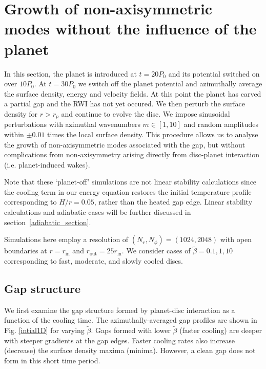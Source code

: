 \section{Growth of non-axisymmetric modes without the influence of the
  planet}\label{linear1}
In this section, the planet is introduced at $t=20P_0$ and 
its potential switched on over $10P_0$. At $t=30P_0$ we switch off the
planet potential and azimuthally average the surface density, energy
and velocity fields. At this point the planet has carved a partial
gap and the RWI has not yet occured.
 We then perturb the surface density for $r>r_p$ and continue to 
evolve the disc. We impose  sinusoidal perturbations with 
azimuthal wavenumbers $m\in[1,10]$ and random amplitudes within $\pm 0.01$
 times the local surface density.%
This procedure allows us to analyse the growth of 
non-axisymmetric modes associated with the gap, but without
complications from non-axisymmetry arising directly from disc-planet
interaction (i.e. planet-induced wakes). 

Note that these `planet-off' simulations are not linear stability
calculations since the cooling term in our energy equation
restores the initial temperature profile corresponding to $H/r=0.05$,
rather than the heated gap edge. Linear stability calculations and
adiabatic cases will be further discussed in
section~\ref{adiabatic_section}.  


Simulations here employ a resolution of $(N_r,N_{\phi})=(1024,2048)$
with open boundaries at $r=r_\mathrm{in}$ and
$r_\mathrm{out}=25r_\mathrm{in}$. We consider   
cases of $\tilde{\beta}=0.1,1,10$ corresponding to fast, moderate,
and slowly cooled discs. %

\subsection{Gap structure}
We first examine the gap structure formed by planet-disc
interaction as a function of the cooling time. The azimuthally-averaged 
gap profiles are shown in Fig. \ref{intial1D} for varying
$\tilde\beta$. Gaps formed with lower $\tilde\beta$ (faster cooling)
are deeper with steeper gradients at the gap edges. Faster cooling rates also 
increase (decrease) the surface density maxima (minima). However, a
clean gap does not form in this short time period. 

